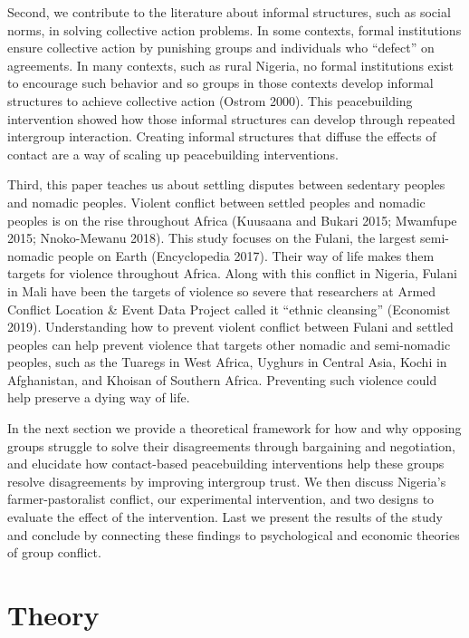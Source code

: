 \documentclass[11pt]{article}
\begin{document}
Second, we contribute to the literature about informal structures, such
as social norms, in solving collective action problems. In some
contexts, formal institutions ensure collective action by punishing
groups and individuals who ``defect'' on agreements. In many contexts,
such as rural Nigeria, no formal institutions exist to encourage such
behavior and so groups in those contexts develop informal structures to
achieve collective action (Ostrom 2000). This peacebuilding intervention
showed how those informal structures can develop through repeated
intergroup interaction. Creating informal structures that diffuse the
effects of contact are a way of scaling up peacebuilding interventions.

Third, this paper teaches us about settling disputes between sedentary
peoples and nomadic peoples. Violent conflict between settled peoples
and nomadic peoples is on the rise throughout Africa (Kuusaana and
Bukari 2015; Mwamfupe 2015; Nnoko-Mewanu 2018). This study focuses on
the Fulani, the largest semi-nomadic people on Earth (Encyclopedia
2017). Their way of life makes them targets for violence throughout
Africa. Along with this conflict in Nigeria, Fulani in Mali have been
the targets of violence so severe that researchers at Armed Conflict
Location \& Event Data Project called it ``ethnic cleansing'' (Economist
2019). Understanding how to prevent violent conflict between Fulani and
settled peoples can help prevent violence that targets other nomadic and
semi-nomadic peoples, such as the Tuaregs in West Africa, Uyghurs in
Central Asia, Kochi in Afghanistan, and Khoisan of Southern Africa.
Preventing such violence could help preserve a dying way of life.

In the next section we provide a theoretical framework for how and why
opposing groups struggle to solve their disagreements through bargaining
and negotiation, and elucidate how contact-based peacebuilding
interventions help these groups resolve disagreements by improving
intergroup trust. We then discuss Nigeria's farmer-pastoralist conflict,
our experimental intervention, and two designs to evaluate the effect of
the intervention. Last we present the results of the study and conclude
by connecting these findings to psychological and economic theories of
group conflict.

\hypertarget{theory}{%
\section{Theory}\label{theory}}
\end{document}
